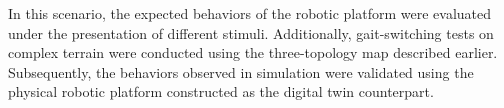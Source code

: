 %

 In this scenario, the expected behaviors of the robotic platform were evaluated under the presentation of different stimuli. Additionally, gait-switching tests on complex terrain were conducted using the three-topology map described earlier. Subsequently, the behaviors observed in simulation were validated using the physical robotic platform constructed as the digital twin counterpart.
